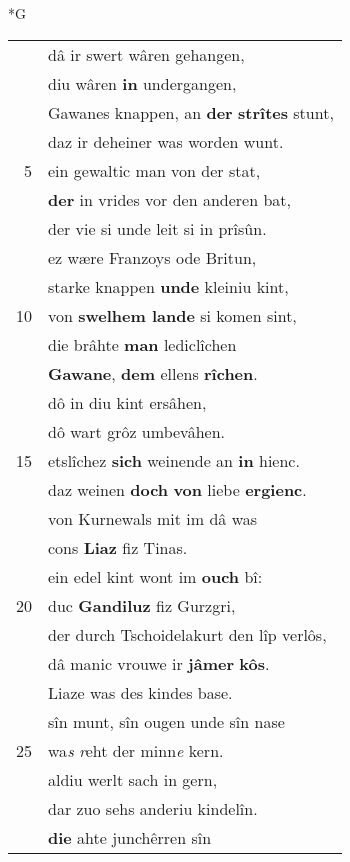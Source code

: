 \documentclass[8pt,a4paper,notitlepage]{article}
\begin{document}
\begin{table}[ht]
\begin{minipage}[t]{0.5\linewidth}
\small
\begin{center}*G
\end{center}
\begin{tabular}{rl}
 & dâ ir swert wâren gehangen,\\ 
 & diu wâren \textbf{in} undergangen,\\ 
 & Gawanes knappen, an \textbf{der} \textbf{strîtes} stunt,\\ 
 & daz ir deheiner was worden wunt.\\ 
5 & ein gewaltic man von der stat,\\ 
 & \textbf{der} in vrides vor den anderen bat,\\ 
 & der vie si unde leit si in prîsûn.\\ 
 & ez wære Franzoys ode Britun,\\ 
 & starke knappen \textbf{unde} kleiniu kint,\\ 
10 & von \textbf{swelhem lande} si komen sint,\\ 
 & die brâhte \textbf{man} lediclîchen\\ 
 & \textbf{Gawane}, \textbf{dem} ellens \textbf{rîchen}.\\ 
 & dô in diu kint ersâhen,\\ 
 & dô wart grôz umbevâhen.\\ 
15 & etslîchez \textbf{sich} weinende an \textbf{in} hienc.\\ 
 & daz weinen \textbf{doch} \textbf{von} liebe \textbf{ergienc}.\\ 
 & von Kurnewals mit im dâ was\\ 
 & cons \textbf{Liaz} fiz Tinas.\\ 
 & ein edel kint wont im \textbf{ouch} bî:\\ 
20 & duc \textbf{Gandiluz} fiz Gurzgri,\\ 
 & der durch Tschoidelakurt den lîp verlôs,\\ 
 & dâ manic vrouwe ir \textbf{jâmer} \textbf{kôs}.\\ 
 & Liaze was des kindes base.\\ 
 & sîn munt, sîn ougen unde sîn nase\\ 
25 & wa\textit{s} \textit{r}eht der minn\textit{e} kern.\\ 
 & aldiu werlt sach in gern,\\ 
 & dar zuo sehs anderiu kindelîn.\\ 
 & \textbf{die} ahte junchêrren sîn\\ 

\end{tabular}
\end{minipage}
\end{table}
\end{document}
